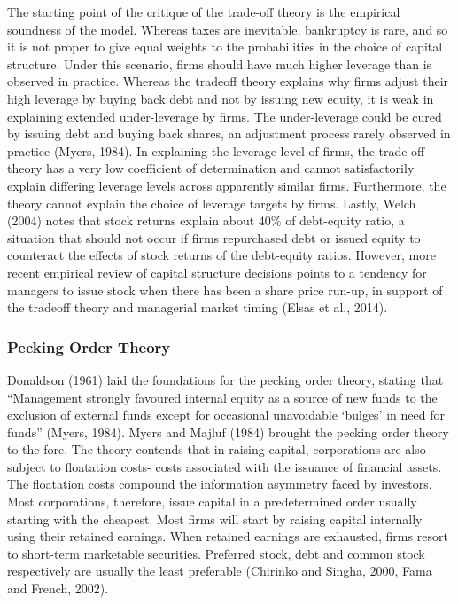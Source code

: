 \documentclass[a4paper, nobind]{templates/ociamthesis}
\begin{document}
The starting point of the critique of the trade-off theory is the empirical soundness of the model. Whereas taxes are inevitable, bankruptcy is rare, and so it is not proper to give equal weights to the probabilities in the choice of capital structure. Under this scenario, firms should have much higher leverage than is observed in practice. Whereas the tradeoff theory explains why firms adjust their high leverage by buying back debt and not by issuing new equity, it is weak in explaining extended under-leverage by firms. The under-leverage could be cured by issuing debt and buying back shares, an adjustment process rarely observed in practice (Myers, 1984).
In explaining the leverage level of firms, the trade-off theory has a very low coefficient of determination and cannot satisfactorily explain differing leverage levels across apparently similar firms. Furthermore, the theory cannot explain the choice of leverage targets by firms. Lastly, Welch (2004) notes that stock returns explain about 40\% of debt-equity ratio, a situation that should not occur if firms repurchased debt or issued equity to counteract the effects of stock returns of the debt-equity ratios. However, more recent empirical review of capital structure decisions points to a tendency for managers to issue stock when there has been a share price run-up, in support of the tradeoff theory and managerial market timing (Elsas et al., 2014).

\hypertarget{pecking-order-theory}{%
\subsubsection{Pecking Order Theory}\label{pecking-order-theory}}

\noindent Donaldson (1961) laid the foundations for the pecking order theory, stating that ``Management strongly favoured internal equity as a source of new funds to the exclusion of external funds except for occasional unavoidable `bulges' in need for funds'' (Myers, 1984). Myers and Majluf (1984) brought the pecking order theory to the fore. The theory contends that in raising capital, corporations are also subject to floatation costs- costs associated with the issuance of financial assets. The floatation costs compound the information asymmetry faced by investors. Most corporations, therefore, issue capital in a predetermined order usually starting with the cheapest. Most firms will start by raising capital internally using their retained earnings. When retained earnings are exhausted, firms resort to short-term marketable securities. Preferred stock, debt and common stock respectively are usually the least preferable (Chirinko and Singha, 2000, Fama and French, 2002).
\end{document}
